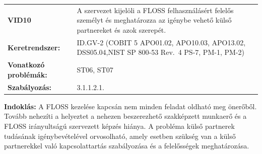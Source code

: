 \documentclass[12pt,magyar,a4paper,oneside]{scrreprt}
\begin{document}
\begin{longtable}[]{@{}ll@{}}
\toprule
\endhead
\begin{minipage}[t]{0.16\columnwidth}\raggedright
\textbf{VID10}\strut
\end{minipage} & \begin{minipage}[t]{0.79\columnwidth}\raggedright
A szervezet kijelöli a FLOSS felhasználásért felelős személyt és
meghatározza az igénybe vehető külső partnereket és azok szerepét.\strut
\end{minipage}\tabularnewline
\begin{minipage}[t]{0.16\columnwidth}\raggedright
\textbf{Keretrendszer:}\strut
\end{minipage} & \begin{minipage}[t]{0.79\columnwidth}\raggedright
ID.GV-2 (COBIT 5 APO01.02, APO10.03, APO13.02, DSS05.04,NIST SP 800-53
Rev.~4 PS-7, PM-1, PM-2)\strut
\end{minipage}\tabularnewline
\begin{minipage}[t]{0.16\columnwidth}\raggedright
\textbf{Vonatkozó problémák:}\strut
\end{minipage} & \begin{minipage}[t]{0.79\columnwidth}\raggedright
ST06, ST07\strut
\end{minipage}\tabularnewline
\begin{minipage}[t]{0.16\columnwidth}\raggedright
\textbf{Szabályozás:}\strut
\end{minipage} & \begin{minipage}[t]{0.79\columnwidth}\raggedright
3.1.1.2.1.\strut
\end{minipage}\tabularnewline
\bottomrule
\end{longtable}

\textbf{Indoklás: } A FLOSS kezelése kapcsán nem minden feladat oldható
meg önerőből. Tovább nehezíti a helyeztet a nehezen beszerezhető
szakképzett munkaerő és a FLOSS irányultságú szervezett képzés hiánya. A
probléma külső partnerek tudásának igénybevételével orvosolható, amely
esetben szükség van a külső partnerekkel való kapcsolattartás
szabályozása és a felelősségek meghatározása.
\end{document}
